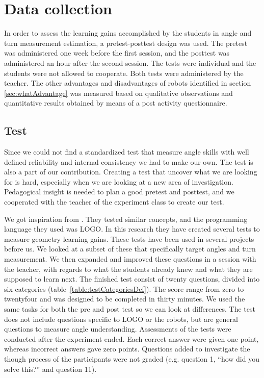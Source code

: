 \section{Data collection}
In order to assess the learning gains accomplished by the students in angle and turn measurement estimation, a pretest-posttest design was used. The pretest was administered one week before the first session, and the posttest was administered an hour after the second session. The tests were individual and the students were not allowed to cooperate. Both tests were administered by the teacher. The other advantages and disadvantages of robots identified in section \ref{sec:whatAdvantage} was measured based on qualitative observations and quantitative results obtained by means of a post activity questionnaire.

\subsection*{Test}
Since we could not find a standardized test that measure angle skills with well defined reliability and internal consistency we had to make our own. The test is also a part of our contribution. Creating a test that uncover what we are looking for is hard, especially when we are looking at a new area of investigation. Pedagogical insight is needed to plan a good pretest and posttest, and we cooperated with the teacher of the experiment class to create our test.

\bigskip\noindent
We got inspiration from \citeauthor{clements2001logo}\cite{clements2001logo}. They tested similar concepts, and the programming language they used was LOGO. In this research they have created several tests to measure geometry learning gains. These tests have been used in several projects before us. We looked at a subset of these that specifically target angles and turn measurement. We then expanded and improved these questions in a session with the teacher, with regards to what the students already knew and what they are supposed to learn next. 
The finished test consist of twenty questions, divided into six categories (table~\ref{table:testCategoriesDef}). The score range from zero to twentyfour and was designed to be completed in thirty minutes. We used the same tasks for both the pre and post test so we can look at differences. The test does not include questions specific to LOGO or the robots, but are general questions to measure angle understanding. 
Assessments of the tests were conducted after the experiment ended. Each correct answer were given one point, whereas incorrect answers gave zero points. Questions added to investigate the though process of the participants were not graded (e.g. question 1, "`how did you solve this?"' and question 11). 

